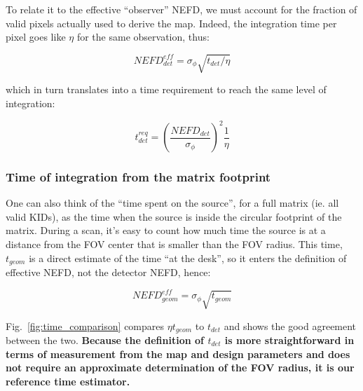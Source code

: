To relate it to the effective ``observer'' NEFD, we must account for the
fraction of valid pixels actually used to derive the map. Indeed, the
integration time per pixel goes like $\eta$ for the same observation, thus:

\begin{equation}
NEFD_{det}^{eff} = \sigma_\phi\sqrt{t_{det}/\eta}
\end{equation}

which in turn translates into a time requirement to reach the same level of integration:

\begin{equation}
t_{det}^{req} = \left(\frac{NEFD_{det}}{\sigma_\phi}\right)^2\frac{1}{\eta}
\label{eq:t_astro}
\end{equation}

\subsubsection{Time of integration from the matrix footprint}

One can also think of the ``time spent on the source'', for a full matrix
(ie. all valid KIDs), as the time when the source is inside the circular
footprint of the matrix. During a scan, it's easy to count how much time the
source is at a distance from the FOV center that is smaller than the FOV
radius. This time, $t_{geom}$ is a direct estimate of the time ``at the desk'',
so it enters the definition of effective NEFD, not the detector NEFD, hence:

\begin{equation}
NEFD^{eff}_{geom} = \sigma_\phi \sqrt{t_{geom}}
\end{equation}

Fig.~\ref{fig:time_comparison} compares $\eta t_{geom}$ to $t_{det}$ and shows
the good agreement between the two. {\bf Because the definition of $t_{det}$ is more
straightforward in terms of measurement from the map and design parameters and
does not require an approximate determination of the FOV radius, it is our
reference time estimator.}



